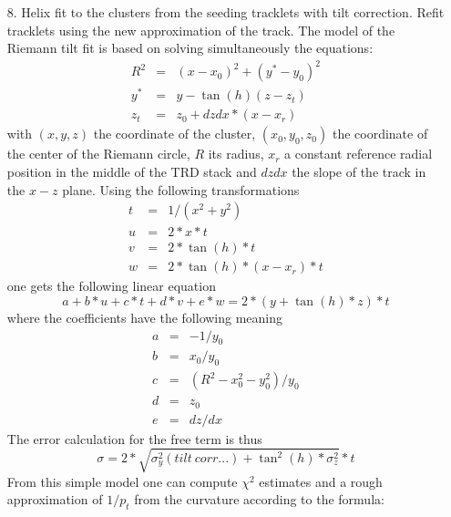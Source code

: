 \documentclass{alicetdr}
\begin{document}
\begin{itemize}
\item[8.] Helix fit to the clusters from the seeding tracklets with tilt correction.
          Refit tracklets using the new approximation of the track. The model of the
          Riemann tilt fit is based on solving simultaneously the equations:
          \begin{eqnarray}
          R^{2} &=& (x-x_{0})^{2} + (y^{*}-y_{0})^{2}\\
          y^{*} &=& y - \tan(h)(z - z_{t})\\
          z_{t} &=& z_{0}+dzdx*(x-x_{r})
          \end{eqnarray}
          with $(x, y, z)$ the coordinate of the cluster, $(x_0, y_0, z_0)$ the
          coordinate of the center of the Riemann circle, $R$ its radius, $x_r$ a
          constant reference radial position in the middle of the TRD stack and $dzdx$
          the slope of the track in the $x-z$ plane. Using the following transformations
          \begin{eqnarray}
          t &=& 1 / (x^{2} + y^{2})\\
          u &=& 2 * x * t\\
          v &=& 2 * \tan(h) * t\\
          w &=& 2 * \tan(h) * (x - x_{r}) * t
          \end{eqnarray}
          one gets the following linear equation
          \begin{equation}
          a + b * u + c * t + d * v  + e * w = 2 * (y + \tan(h) * z) * t
          \end{equation}
          where the coefficients have the following meaning
          \begin{eqnarray}
          a &=& -1/y_{0}\\
          b &=& x_{0}/y_{0}\\
          c &=& (R^{2} -x_{0}^{2} - y_{0}^{2})/y_{0}\\
          d &=& z_{0}\\
          e &=& dz/dx
          \end{eqnarray}
          The error calculation for the free term is thus
          \begin{equation}
          \sigma = 2 * \sqrt{\sigma^{2}_{y}(tilt\ corr ...)
                 + \tan^{2}(h) * \sigma^{2}_{z}} * t
          \end{equation}
          From this simple model one can compute $\chi^2$ estimates and a rough
          approximation of $1/p_t$ from the curvature according to the formula:

\end{itemize}
\end{document}

